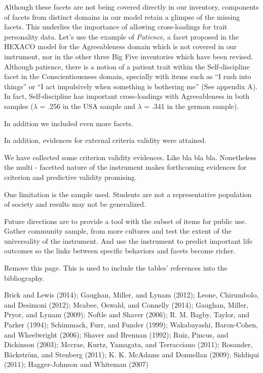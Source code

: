 \documentclass[,man,floatsintext]{apa6}
\begin{document}
Although these facets are not being covered directly in our inventory,
components of facets from distinct domains in our model retain a glimpse
of the missing facets. This underlies the importance of allowing
cross-loadings for trait personality data. Let's use the example of
\emph{Patience}, a facet proposed in the HEXACO model for the
Agreeableness domain which is not covered in our instrument, nor in the
other three Big Five inventories which have been revised. Although
patience, there is a notion of a patient trait within the
Self-discipline facet in the Conscientiousness domain, specially with
items such as \enquote{I rush into things} or \enquote{I act impulsively
when something is bothering me} (See appendix A). In fact,
Self-discipline has important cross-loadings with Agreeableness in both
samples (\(\lambda\) = .256 in the USA sample and \(\lambda\) = .341 in
the german sample).

In addition we included even more facets.

In addition, evidences for external criteria validity were attained.

We have collected some criterion validity evidences. Like bla bla bla.
Nonetheless the multi - facetted nature of the instrument makes
forthcoming evidences for criterion and predictive validity promising.

One limitation is the sample used. Students are not a representative
population of society and results may not be generalized.

Future directions are to provide a tool with the subset of items for
public use. Gather community sample, from more cultures and test the
extent of the universality of the instrument. And use the instrument to
predict important life outcomes so the links between specific behaviors
and facets become richer.

\newpage

Remove this page. This is used to include the tables' references into
the bibliography.

Brick and Lewis (2014); Gaughan, Miller, and Lynam (2012); Leone,
Chirumbolo, and Desimoni (2012); Mcabee, Oswald, and Connelly (2014);
Gaughan, Miller, Pryor, and Lynam (2009); Noftle and Shaver (2006); R.
M. Bagby, Taylor, and Parker (1994); Schimmack, Furr, and Funder (1999);
Wakabayashi, Baron-Cohen, and Wheelwright (2006); Shaver and Brennan
(1992); Ruiz, Pincus, and Dickinson (2003); Mccrae, Kurtz, Yamagata, and
Terracciano (2011); Rosander, Bäckström, and Stenberg (2011); K. K.
McAdams and Donnellan (2009); Siddiqui (2011); Hagger-Johnson and
Whiteman (2007)
\end{document}
